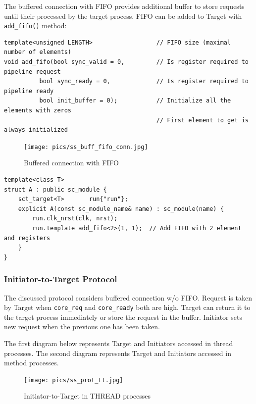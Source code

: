 The buffered connection with FIFO provides additional buffer to store requests until their processed by the target process. FIFO can be added to Target with {\tt add\_fifo()} method:

\begin{lstlisting}[style=mycpp]
template<unsigned LENGTH>                  // FIFO size (maximal number of elements)
void add_fifo(bool sync_valid = 0,         // Is register required to pipeline request
          bool sync_ready = 0,             // Is register required to pipeline ready 
          bool init_buffer = 0);           // Initialize all the elements with zeros 
                                           // First element to get is always initialized
\end{lstlisting}

\begin{figure}[!htb]
\centering
\texttt{[image: pics/ss\_buff\_fifo\_conn.jpg]}
\caption{Buffered connection with FIFO}
\label{fig:ss_usage}
\end{figure}

\begin{lstlisting}[style=mycpp]
template<class T>
struct A : public sc_module {
    sct_target<T>       run{"run"}; 
    explicit A(const sc_module_name& name) : sc_module(name) {
        run.clk_nrst(clk, nrst);
        run.template add_fifo<2>(1, 1);  // Add FIFO with 2 element and registers 
    }
}
\end{lstlisting}

\subsubsection{Initiator-to-Target Protocol}

The discussed protocol considers buffered connection w/o FIFO. Request is taken by Target when {\tt core\_req} and {\tt core\_ready} both are high. Target can return it to the target process immediately or store the request in the buffer. Initiator sets new request when the previous one has been taken.

The first diagram below represents Target and Initiators accessed in thread processes. The second diagram represents Target and Initiators accessed in method processes.

\begin{figure}[!htb]
\centering
\texttt{[image: pics/ss\_prot\_tt.jpg]}
\caption{Initiator-to-Target in THREAD processes}
\label{fig:ss_usage}
\end{figure}

